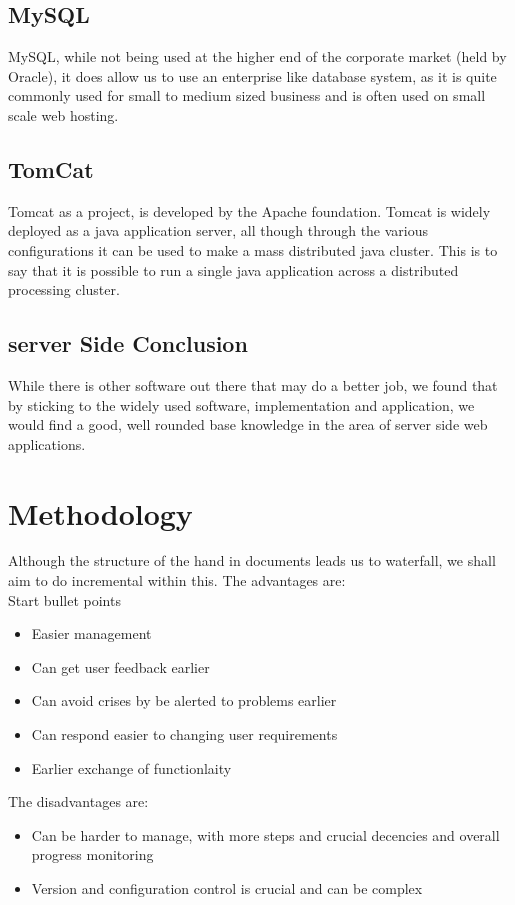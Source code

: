 \documentclass{project}
\begin{document}
\subsection{MySQL}
MySQL, while not being used at the higher end of the corporate market (held by
Oracle), it does allow us to use an enterprise like database system, as it is quite
commonly used for small to medium sized business and is often used on small scale
web hosting.
\subsection{TomCat}
Tomcat as a project, is developed by the Apache foundation. Tomcat is widely
deployed as a java application server, all though through the various configurations
it can be used to make a mass distributed java cluster. This is to say that it is
possible to run a single java application across a distributed processing cluster.
\subsection{server Side Conclusion}
While there is other software out there that may do a better job, we found that by
sticking to the widely used software, implementation and application, we would find
a good, well rounded base knowledge in the area of server side web applications.
\section{Methodology}
Although the structure of the hand in documents leads us to waterfall, we shall aim
to do incremental within this.
The advantages are:
\\
Start bullet points
\begin{itemize}
	\item Easier management
	\item Can get user feedback earlier
	\item Can avoid crises by be alerted to problems earlier
	\item Can respond easier to changing user requirements
	\item Earlier exchange of functionlaity
\end{itemize}

The disadvantages are:
\begin{itemize}
	\item Can be harder to manage, with more steps and crucial decencies and overall
progress monitoring
	\item Version and configuration control is crucial and can be complex
\end{itemize}
\end{document}
